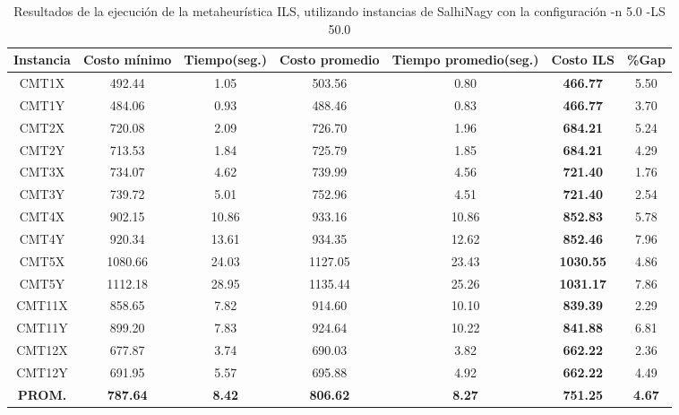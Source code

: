 \begin{table}[ht]
\caption{Resultados de la ejecución de la metaheurística ILS, utilizando instancias de SalhiNagy con la configuración -n 5.0 -LS 50.0}
\centering
\small
\begin{tabular}{c c c c c c c}
\hline\hline
Instancia & Costo mínimo & Tiempo(seg.) & Costo promedio & Tiempo promedio(seg.) & Costo ILS & \%Gap \\ [0.5ex]
\hline
CMT1X & 492.44 & 1.05 & 
503.56 & 0.80 & \bf{466.77} & 
5.50\\CMT1Y & 484.06 & 0.93 & 
488.46 & 0.83 & \bf{466.77} & 
3.70\\CMT2X & 720.08 & 2.09 & 
726.70 & 1.96 & \bf{684.21} & 
5.24\\CMT2Y & 713.53 & 1.84 & 
725.79 & 1.85 & \bf{684.21} & 
4.29\\CMT3X & 734.07 & 4.62 & 
739.99 & 4.56 & \bf{721.40} & 
1.76\\CMT3Y & 739.72 & 5.01 & 
752.96 & 4.51 & \bf{721.40} & 
2.54\\CMT4X & 902.15 & 10.86 & 
933.16 & 10.86 & \bf{852.83} & 
5.78\\CMT4Y & 920.34 & 13.61 & 
934.35 & 12.62 & \bf{852.46} & 
7.96\\CMT5X & 1080.66 & 24.03 & 
1127.05 & 23.43 & \bf{1030.55} & 
4.86\\CMT5Y & 1112.18 & 28.95 & 
1135.44 & 25.26 & \bf{1031.17} & 
7.86\\CMT11X & 858.65 & 7.82 & 
914.60 & 10.10 & \bf{839.39} & 
2.29\\CMT11Y & 899.20 & 7.83 & 
924.64 & 10.22 & \bf{841.88} & 
6.81\\CMT12X & 677.87 & 3.74 & 
690.03 & 3.82 & \bf{662.22} & 
2.36\\CMT12Y & 691.95 & 5.57 & 
695.88 & 4.92 & \bf{662.22} & 
4.49\\\bf{PROM.} & 
\bf{787.64} & \bf{8.42} & \bf{806.62} & \bf{8.27} & \bf{751.25} & \bf{4.67}\\[1ex]\hline
\end{tabular}
\label{table:nonlin}
\end{table} \clearpage
